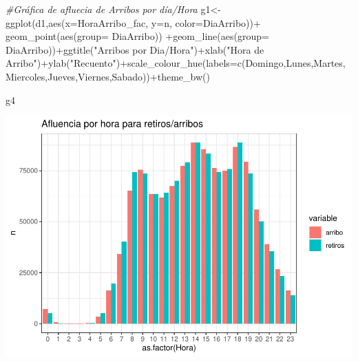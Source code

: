 \documentclass[
]{article}
\newenvironment{Shaded}{\begin{snugshade}}{\end{snugshade}}
\newcommand{\AttributeTok}[1]{\textcolor[rgb]{0.77,0.63,0.00}{#1}}
\newcommand{\CommentTok}[1]{\textcolor[rgb]{0.56,0.35,0.01}{\textit{#1}}}
\newcommand{\FunctionTok}[1]{\textcolor[rgb]{0.00,0.00,0.00}{#1}}
\newcommand{\NormalTok}[1]{#1}
\newcommand{\OtherTok}[1]{\textcolor[rgb]{0.56,0.35,0.01}{#1}}
\newcommand{\SpecialCharTok}[1]{\textcolor[rgb]{0.00,0.00,0.00}{#1}}
\newcommand{\StringTok}[1]{\textcolor[rgb]{0.31,0.60,0.02}{#1}}
\begin{document}
\begin{Shaded}
\begin{Highlighting}[]
\CommentTok{\#Gráfica de afluecia de Arribos por día/Hora}
\NormalTok{g1}\OtherTok{\textless{}{-}}\FunctionTok{ggplot}\NormalTok{(d1,}\FunctionTok{aes}\NormalTok{(}\AttributeTok{x=}\NormalTok{HoraArribo\_fac, }\AttributeTok{y=}\NormalTok{n, }\AttributeTok{color=}\NormalTok{DiaArribo))}\SpecialCharTok{+} \FunctionTok{geom\_point}\NormalTok{(}\FunctionTok{aes}\NormalTok{(}\AttributeTok{group=}\NormalTok{ DiaArribo)) }\SpecialCharTok{+}\FunctionTok{geom\_line}\NormalTok{(}\FunctionTok{aes}\NormalTok{(}\AttributeTok{group=}\NormalTok{ DiaArribo))}\SpecialCharTok{+}\FunctionTok{ggtitle}\NormalTok{(}\StringTok{"Arribos por Dia/Hora"}\NormalTok{)}\SpecialCharTok{+}\FunctionTok{xlab}\NormalTok{(}\StringTok{"Hora de Arribo"}\NormalTok{)}\SpecialCharTok{+}\FunctionTok{ylab}\NormalTok{(}\StringTok{"Recuento"}\NormalTok{)}\SpecialCharTok{+}\FunctionTok{scale\_colour\_hue}\NormalTok{(}\AttributeTok{labels=}\FunctionTok{c}\NormalTok{(}\StringTok{\textquotesingle{}Domingo\textquotesingle{}}\NormalTok{,}\StringTok{\textquotesingle{}Lunes\textquotesingle{}}\NormalTok{,}\StringTok{\textquotesingle{}Martes\textquotesingle{}}\NormalTok{,}\StringTok{\textquotesingle{}Miercoles\textquotesingle{}}\NormalTok{,}\StringTok{\textquotesingle{}Jueves\textquotesingle{}}\NormalTok{,}\StringTok{\textquotesingle{}Viernes\textquotesingle{}}\NormalTok{,}\StringTok{\textquotesingle{}Sabado\textquotesingle{}}\NormalTok{))}\SpecialCharTok{+}\FunctionTok{theme\_bw}\NormalTok{()}
\end{Highlighting}
\end{Shaded}

\begin{Shaded}
\begin{Highlighting}[]
\NormalTok{g4}
\end{Highlighting}
\end{Shaded}

\includegraphics{Ecobici_files/figure-latex/unnamed-chunk-2-1.pdf}
\end{document}
